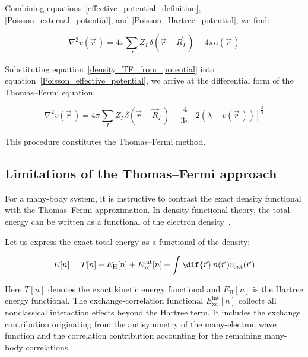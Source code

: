 Combining equations~\eqref{effective_potential_definition}, \eqref{Poisson_external_potential}, and \eqref{Poisson_Hartree_potential}, we find:

\begin{equation}
    \nabla^2 v(\vec{r}\,)=4\pi\sum_I Z_I\,\delta\left(\vec{r}-\vec{R}_I\,\right)-4\pi n(\vec{r}\,)
\label{Poisson_effective_potential}
\end{equation}

Substituting equation~\eqref{density_TF_from_potential} into equation~\eqref{Poisson_effective_potential}, we arrive at the differential form of the Thomas--Fermi equation:

\begin{equation}
    \nabla^2 v(\vec{r}\,)=4\pi\sum_I Z_I\,\delta\left(\vec{r}-\vec{R}_I\,\right)-\frac{4}{3\pi}\left[2\left(\lambda-v(\vec{r}\,)\right)\right]^{\frac{3}{2}}
\label{differential_form_Thomas_Fermi_equation}
\end{equation}

This procedure constitutes the Thomas--Fermi method.

\subsection{Limitations of the Thomas--Fermi approach}

For a many-body system,
it is instructive to contrast the exact density functional with the Thomas--Fermi approximation.
In density functional theory, the total energy can be written as a functional of the electron density~\cite{hohenberg1964inhomogeneous,jones2015density}.

Let us express the exact total energy as a functional of the density:

\begin{equation}
    E[n]=T[n]+E_\mathrm{H}[n]+E_\mathrm{xc}^\mathrm{int}[n]+\int\dif{\vec{r}}\,n(\vec{r}\,)v_\mathrm{ext}(\vec{r}\,)
\label{functional_exact_total_energy}
\end{equation}

Here $T[n]$ denotes the exact kinetic energy functional and $E_\mathrm{H}[n]$ is the Hartree energy functional.
The exchange-correlation functional $E_\mathrm{xc}^\mathrm{int}[n]$ collects all nonclassical interaction effects beyond the Hartree term.
It includes the exchange contribution originating from the antisymmetry of the many-electron wave function and the correlation contribution accounting for the remaining many-body correlations.

